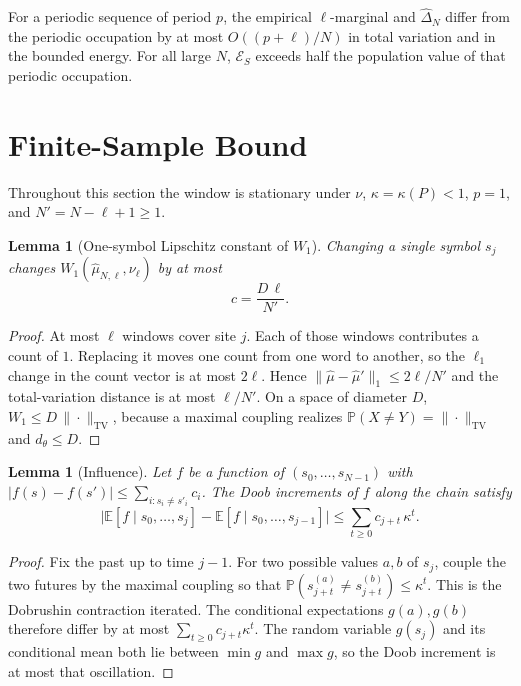 \documentclass[11pt,reqno]{amsart}
\newtheorem{lemma}[theorem]{Lemma}
\theoremstyle{remark}
\newcommand{\ES}{\mathcal{E}_S}
\newcommand{\TV}{\mathrm{TV}}
\begin{document}
For a periodic sequence of period $p$, the empirical $\ell$-marginal and $\hat\Delta_N$ differ from the periodic occupation by at most $O((p+\ell)/N)$ in total variation and in the bounded energy. For all large $N$, $\ES$ exceeds half the population value of that periodic occupation.

\section{Finite-Sample Bound}\label{sec:finite-sample}

Throughout this section the window is stationary under $\nu$, $\kappa = \kappa(P) < 1$, $p = 1$, and $N' = N - \ell + 1 \ge 1$.

\begin{lemma}[One-symbol Lipschitz constant of $W_1$]\label{lem:lip}
Changing a single symbol $s_j$ changes $W_1(\hat\mu_{N,\ell}, \nu_\ell)$ by at most
\[
c = \frac{D \,\ell}{N'}.
\]
\end{lemma}
\begin{proof}
At most $\ell$ windows cover site $j$. Each of those windows contributes a count of $1$. Replacing it moves one count from one word to another, so the $\ell_1$ change in the count vector is at most $2\ell$. Hence $\|\hat\mu-\hat\mu'\|_1 \le 2\ell/N'$ and the total-variation distance is at most $\ell/N'$. On a space of diameter $D$, $W_1 \le D \,\|\cdot\|_{\TV}$, because a maximal coupling realizes $\mathbb{P}(X \ne Y) = \|\cdot\|_{\TV}$ and $d_\theta \le D$.
\end{proof}

\begin{lemma}[Influence]\label{lem:influence}
Let $f$ be a function of $(s_0,\ldots,s_{N-1})$ with $|f(s)-f(s')| \le \sum_{i: s_i \ne s'_i} c_i$. The Doob increments of $f$ along the chain satisfy
\[
\bigl|\mathbb{E}[f \mid s_0,\ldots,s_j] - \mathbb{E}[f \mid s_0,\ldots,s_{j-1}]\bigr|
\le
\sum_{t \ge 0} c_{j+t}\, \kappa^{t}.
\]
\end{lemma}
\begin{proof}
Fix the past up to time $j-1$. For two possible values $a,b$ of $s_j$, couple the two futures by the maximal coupling so that $\mathbb{P}(s_{j+t}^{(a)} \ne s_{j+t}^{(b)}) \le \kappa^t$. This is the Dobrushin contraction iterated. The conditional expectations $g(a), g(b)$ therefore differ by at most $\sum_{t \ge 0} c_{j+t} \kappa^t$. The random variable $g(s_j)$ and its conditional mean both lie between $\min g$ and $\max g$, so the Doob increment is at most that oscillation.
\end{proof}
\end{document}

